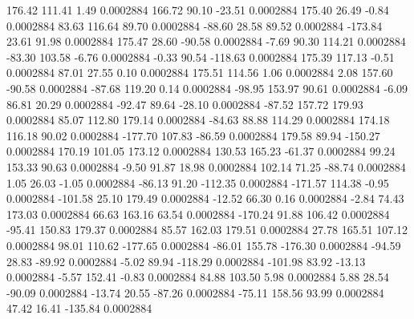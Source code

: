       176.42      111.41        1.49     0.0002884
      166.72       90.10      -23.51     0.0002884
      175.40       26.49       -0.84     0.0002884
       83.63      116.64       89.70     0.0002884
      -88.60       28.58       89.52     0.0002884
     -173.84       23.61       91.98     0.0002884
      175.47       28.60      -90.58     0.0002884
       -7.69       90.30      114.21     0.0002884
      -83.30      103.58       -6.76     0.0002884
       -0.33       90.54     -118.63     0.0002884
      175.39      117.13       -0.51     0.0002884
       87.01       27.55        0.10     0.0002884
      175.51      114.56        1.06     0.0002884
        2.08      157.60      -90.58     0.0002884
      -87.68      119.20        0.14     0.0002884
      -98.95      153.97       90.61     0.0002884
       -6.09       86.81       20.29     0.0002884
      -92.47       89.64      -28.10     0.0002884
      -87.52      157.72      179.93     0.0002884
       85.07      112.80      179.14     0.0002884
      -84.63       88.88      114.29     0.0002884
      174.18      116.18       90.02     0.0002884
     -177.70      107.83      -86.59     0.0002884
      179.58       89.94     -150.27     0.0002884
      170.19      101.05      173.12     0.0002884
      130.53      165.23      -61.37     0.0002884
       99.24      153.33       90.63     0.0002884
       -9.50       91.87       18.98     0.0002884
      102.14       71.25      -88.74     0.0002884
        1.05       26.03       -1.05     0.0002884
      -86.13       91.20     -112.35     0.0002884
     -171.57      114.38       -0.95     0.0002884
     -101.58       25.10      179.49     0.0002884
      -12.52       66.30        0.16     0.0002884
       -2.84       74.43      173.03     0.0002884
       66.63      163.16       63.54     0.0002884
     -170.24       91.88      106.42     0.0002884
      -95.41      150.83      179.37     0.0002884
       85.57      162.03      179.51     0.0002884
       27.78      165.51      107.12     0.0002884
       98.01      110.62     -177.65     0.0002884
      -86.01      155.78     -176.30     0.0002884
      -94.59       28.83      -89.92     0.0002884
       -5.02       89.94     -118.29     0.0002884
     -101.98       83.92      -13.13     0.0002884
       -5.57      152.41       -0.83     0.0002884
       84.88      103.50        5.98     0.0002884
        5.88       28.54      -90.09     0.0002884
      -13.74       20.55      -87.26     0.0002884
      -75.11      158.56       93.99     0.0002884
       47.42       16.41     -135.84     0.0002884
